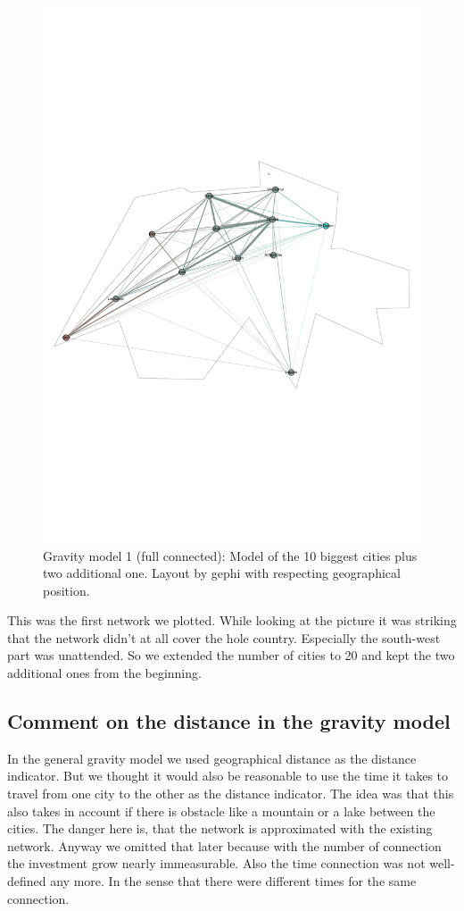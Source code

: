 \documentclass[11pt]{article}
\begin{document}
\begin{figure}
\centering
\includegraphics[scale=0.25]{switzerland_network1}
 \caption{Gravity model 1 (full connected): Model of the 10 biggest cities plus two additional one. Layout by gephi with respecting geographical position.}
\end{figure}

This was the first network we plotted. While looking at the picture it was striking that the network didn't at all cover the hole country. Especially the south-west part was unattended. So we extended the number of cities to 20 and kept the two additional ones from the beginning.


\subsection{Comment on the distance in the gravity model}
In the general gravity model we used geographical distance as the distance indicator. But we thought it would also be reasonable to use the time it takes to travel from one city to the other as the distance indicator. The idea was that this also takes in account if there is obstacle like a mountain or a lake between the cities. The danger here is, that the network is approximated with the existing network. Anyway we omitted that later because with the number of connection the investment grow nearly immeasurable. Also the time connection was not well-defined any more. In the sense that there were different times for the same connection.
\end{document}
